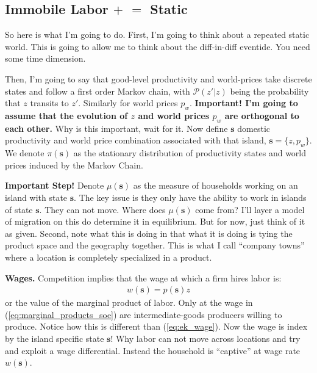 \documentclass[pdftex,12pt]{article}
\begin{document}
\subsection{Immobile Labor $+$ \citet{eaton2002technology} $=$ Static \citet{lyon2019}}

So here is what I'm going to do. First, I'm going to think about a repeated static world. This is going to allow me to think about the diff-in-diff eventide. You need some time dimension. 

\medskip
\noindent Then, I'm going to say that good-level productivity and world-prices take discrete states and follow a first order Markov chain, with $\mathcal{P}(z'|z)$ being the probability that $z$ transits to $z'$. Similarly for world prices $p_w$. \textbf{ Important! I'm going to assume that the evolution of $z$ and world prices $p_w$ are orthogonal to each other.} Why is this important, wait for it. Now define $\textbf{s}$ domestic productivity and world price combination associated with that island, $\textbf{s} = \{z, p_w\}$. We denote $\pi(\textbf{s})$ as the stationary distribution of productivity states and world prices induced by the Markov Chain.

\medskip
\noindent \textbf{Important Step!} Denote $\mu(\textbf{s})$ as the measure of households working on an island with state $\textbf{s}$. The key issue is they only have the ability to work in islands of state $\textbf{s}$. They can not move. Where does $\mu(\textbf{s})$ come from? I'll layer a model of migration on this do determine it in equilibrium. But for now, just think of it as given. Second, note what this is doing in that what it is doing is tying the product space and the geography together. This is what I call ``company towns'' where a location is completely specialized in a product.

\medskip
\noindent \textbf{Wages.} Competition implies that the wage at which a firm hires labor is:
\begin{align}
w(\textbf{s}) = p(\textbf{s}) z
\label{eq:marginal_products_soe}
\end{align}
or the value of the marginal product of labor. Only at the wage in (\ref{eq:marginal_products_soe}) are intermediate-goods producers willing to produce. Notice how this is different than (\ref{eq:ek_wage}). Now the wage is index by the island specific state $\textbf{s}$! Why labor can not move across locations and try and exploit a wage differential. Instead the household is ``captive'' at wage rate $w(\textbf{s})$.
\end{document}

